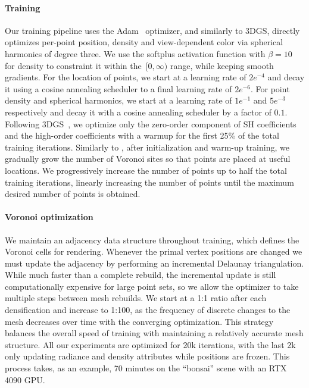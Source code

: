 \paragraph{Training} 
Our training pipeline uses the Adam~\cite{adam} optimizer, and similarly to 3DGS, directly optimizes per-point position, density and view-dependent color via spherical harmonics of degree three.
We use the softplus activation function with $\beta{=}10$ for density to constraint it within the~$[0, \infty)$ range, while keeping smooth gradients.
For the location of points, we start at a learning rate of $2e^{-4}$ and decay it using a cosine annealing scheduler to a final learning rate of $2e^{-6}$.
For point density and spherical harmonics, we start at a learning rate of $1e^{-1}$ and $5e^{-3}$ respectively and decay it with a cosine annealing scheduler by a factor of $0.1$.
Following 3DGS~\cite{gsplat}, we optimize only the zero-order component of SH coefficients and the high-order coefficients with a warmup for the first 25\% of the total training iterations.
% 
\quad
Similarly to \cite{revising-densification, 3dgs-mcmc}, after initialization and warm-up training, we gradually grow the number of Voronoi sites so that points are placed at useful locations.
We progressively increase the number of points up to half the total training iterations, linearly increasing the number of points until the maximum desired number of points is obtained.

\paragraph{Voronoi optimization}
We maintain an adjacency data structure throughout training, which defines the Voronoi cells for rendering.
Whenever the primal vertex positions are changed we must update the adjacency by performing an incremental Delaunay triangulation.
While much faster than a complete rebuild, the incremental update is still computationally expensive for large point sets, so we allow the optimizer to take multiple steps between mesh rebuilds.
We start at a 1:1 ratio after each densification and increase to 1:100, as the frequency of discrete changes to the mesh decreases over time with the converging optimization.
This strategy balances the overall speed of training with maintaining a relatively accurate mesh structure.
All our experiments are optimized for 20k iterations, with the last 2k only updating radiance and density attributes while positions are frozen.
This process takes, as an example, 70 minutes on the ``bonsai'' scene with an RTX 4090 GPU.

